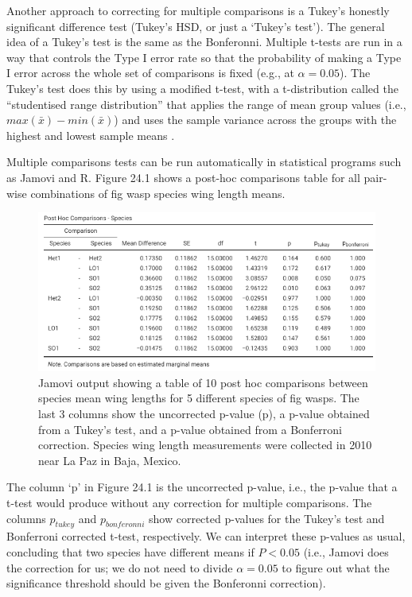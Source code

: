 \documentclass[
]{scrbook}
\begin{document}
Another approach to correcting for multiple comparisons is a Tukey's honestly significant difference test (Tukey's HSD, or just a `Tukey's test').
The general idea of a Tukey's test is the same as the Bonferonni.
Multiple t-tests are run in a way that controls the Type I error rate so that the probability of making a Type I error across the whole set of comparisons is fixed (e.g., at \(\alpha = 0.05\)).
The Tukey's test does this by using a modified t-test, with a t-distribution called the ``studentised range distribution'' that applies the range of mean group values (i.e., \(max(\bar{x}) - min(\bar{x})\)) and uses the sample variance across the groups with the highest and lowest sample means \citep{Tukey1949, Box1978}.

Multiple comparisons tests can be run automatically in statistical programs such as Jamovi and R.
Figure 24.1 shows a post-hoc comparisons table for all pair-wise combinations of fig wasp species wing length means.

\begin{figure}
\includegraphics[width=1\linewidth]{img/jamovi_multiple_comparisons} \caption{Jamovi output showing a table of 10 post hoc comparisons between species mean wing lengths for 5 different species of fig wasps. The last 3 columns show the uncorrected p-value (p), a p-value obtained from a Tukey's test, and a p-value obtained from a Bonferroni correction. Species wing length measurements were collected in 2010 near La Paz in Baja, Mexico.}\label{fig:unnamed-chunk-115}
\end{figure}

The column `p' in Figure 24.1 is the uncorrected p-value, i.e., the p-value that a t-test would produce without any correction for multiple comparisons.
The columns \(p_{tukey}\) and \(p_{bonferonni}\) show corrected p-values for the Tukey's test and Bonferroni corrected t-test, respectively.
We can interpret these p-values as usual, concluding that two species have different means if \(P < 0.05\) (i.e., Jamovi does the correction for us; we do not need to divide \(\alpha = 0.05\) to figure out what the significance threshold should be given the Bonferonni correction).
\end{document}
